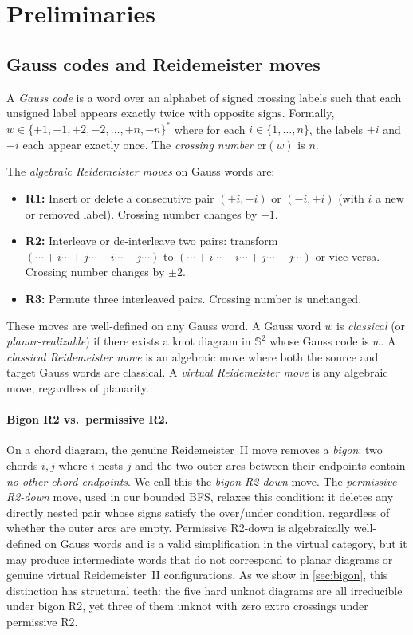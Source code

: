 \documentclass[a4paper,UKenglish,cleveref,autoref]{lipics-v2021}
\begin{document}
\section{Preliminaries}

\subsection{Gauss codes and Reidemeister moves}

A \emph{Gauss code} is a word over an alphabet of signed crossing labels such that each unsigned label appears exactly twice with opposite signs.
Formally, $w \in \{+1, -1, +2, -2, \ldots, +n, -n\}^*$ where for each $i \in \{1, \ldots, n\}$, the labels $+i$ and $-i$ each appear exactly once.
The \emph{crossing number} $\mathrm{cr}(w)$ is $n$.

The \emph{algebraic Reidemeister moves} on Gauss words are:
\begin{itemize}
\item \textbf{R1:} Insert or delete a consecutive pair $(+i, -i)$ or $(-i, +i)$ (with $i$ a new or removed label).
Crossing number changes by $\pm 1$.
\item \textbf{R2:} Interleave or de-interleave two pairs: transform $(\cdots +i \cdots +j \cdots -i \cdots -j \cdots)$ to $(\cdots +i \cdots -i \cdots +j \cdots -j \cdots)$ or vice versa.
Crossing number changes by $\pm 2$.
\item \textbf{R3:} Permute three interleaved pairs.
Crossing number is unchanged.
\end{itemize}

These moves are well-defined on any Gauss word.
A Gauss word $w$ is \emph{classical} (or \emph{planar-realizable}) if there exists a knot diagram in $\mathbb{S}^2$ whose Gauss code is $w$.
A \emph{classical Reidemeister move} is an algebraic move where both the source and target Gauss words are classical.
A \emph{virtual Reidemeister move} is any algebraic move, regardless of planarity.

\paragraph*{Bigon R2 vs.\ permissive R2.}
On a chord diagram, the genuine Reidemeister~II move removes a \emph{bigon}: two chords $i, j$ where $i$ nests $j$ and the two outer arcs between their endpoints contain \emph{no other chord endpoints}.
We call this the \emph{bigon R2-down} move.
The \emph{permissive R2-down} move, used in our bounded BFS, relaxes this condition: it deletes any directly nested pair whose signs satisfy the over/under condition, regardless of whether the outer arcs are empty.
Permissive R2-down is algebraically well-defined on Gauss words and is a valid simplification in the virtual category, but it may produce intermediate words that do not correspond to planar diagrams or genuine virtual Reidemeister~II configurations.
As we show in \cref{sec:bigon}, this distinction has structural teeth: the five hard unknot diagrams are all irreducible under bigon R2, yet three of them unknot with zero extra crossings under permissive R2.
\end{document}
